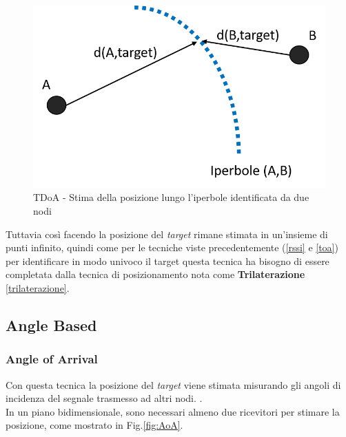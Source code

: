\begin{figure}[H]  
	\centering 
	\includegraphics[scale=0.4]{ContestoApplicativo/tdoa1.png}
	\caption{TDoA - Stima della posizione lungo l'iperbole identificata da due nodi}
	\label{fig:tdoa1}
\end{figure}

	Tuttavia così facendo la posizione del \textit{target} rimane stimata in un'insieme di punti infinito, quindi come per le tecniche viste precedentemente (\ref{rssi} e \ref{toa}) per identificare in modo univoco il target questa tecnica ha bisogno di essere completata dalla tecnica di posizionamento nota come \textbf{Trilaterazione} \ref{trilaterazione}.

\subsection{Angle Based}
\label{angle}
\subsubsection{Angle of Arrival}
\label{aoa}
Con questa tecnica la posizione del \textit{target} viene stimata misurando gli angoli di incidenza del segnale trasmesso ad altri nodi. \cite{AoA}.\\
In un piano bidimensionale, sono necessari almeno due ricevitori per stimare la posizione, come mostrato in Fig.\ref{fig:AoA}. 

